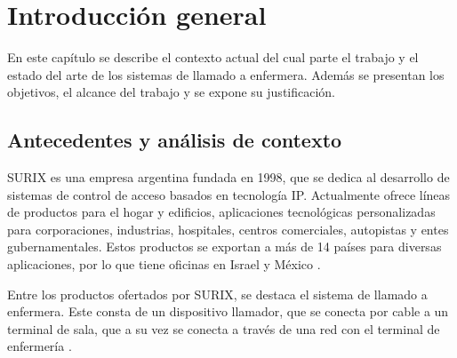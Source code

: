 
\chapter{Introducción general} %

\label{Chapter1} %

En este capítulo se describe el contexto actual del cual parte el trabajo y el estado del arte de los sistemas de llamado a enfermera. Además se presentan los objetivos, el alcance del trabajo y se expone su justificación.

\label{IntroGeneral}


\newcommand{\keyword}[1]{\textbf{#1}}
\newcommand{\tabhead}[1]{\textbf{#1}}
\newcommand{\code}[1]{\texttt{#1}}
\newcommand{\file}[1]{\texttt{\bfseries#1}}
\newcommand{\option}[1]{\texttt{\itshape#1}}
\newcommand{\grados}{$^{\circ}$}



\section{Antecedentes y análisis de contexto}
\label{sec:AntyCont}

SURIX es una empresa argentina fundada en 1998, que se dedica al desarrollo de sistemas de control de acceso basados en tecnología IP. Actualmente ofrece líneas de productos para el hogar y edificios, aplicaciones tecnológicas personalizadas para corporaciones, industrias, hospitales, centros comerciales, autopistas y entes gubernamentales. Estos productos se exportan a más de 14 países para diversas aplicaciones, por lo que tiene oficinas en Israel y México \cite{surix}.

Entre los productos ofertados por SURIX, se destaca el sistema de llamado a enfermera. Este consta de un dispositivo llamador, que se conecta por cable a un terminal de sala, que a su vez se conecta a través de una red con el terminal de enfermería \cite{helpip}.

